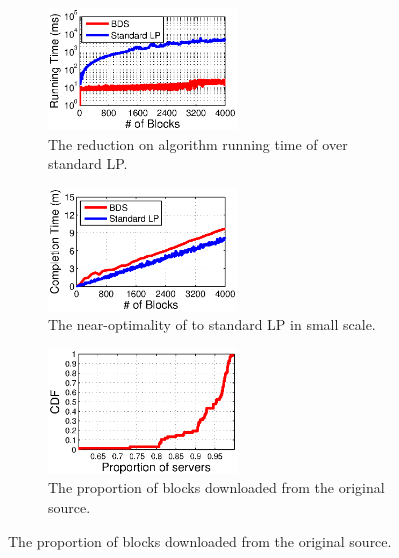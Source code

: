 \begin{figure}[t]
        \centering
        \begin{subfigure}[b]{0.3\textwidth}
                \centering
                \includegraphics[width=50mm]{images/BDSvsLP_v2.eps} %
                \caption{The reduction on algorithm running time of \name over standard LP.}
                \label{fig:further:BDSvsLP}
        \end{subfigure}
        \begin{subfigure}[b]{0.3\textwidth}
                \centering
                \includegraphics[width=50mm]{images/BDSvsLP_CT.eps}%
                \caption{The near-optimality of \name to standard LP in small scale.}
                \label{fig:further:BDSvsLP_CT}
        \end{subfigure}
        \begin{subfigure}[b]{0.3\textwidth}
                \centering
                \includegraphics[width=50mm]{images/overlay.eps}
                \caption{The proportion of blocks downloaded from the original source.}
                \label{fig:further:overlay}
        \end{subfigure}
        \label{fig:further}
\end{figure}

